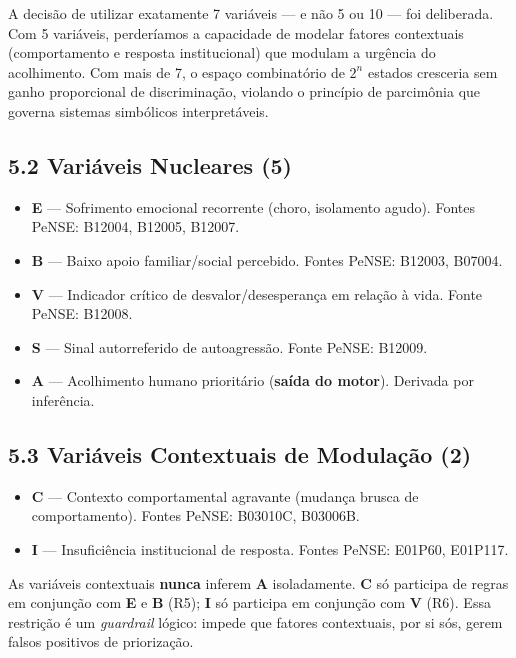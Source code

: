 \documentclass[11pt]{article}
\providecommand{\tightlist}{%
      \setlength{\itemsep}{0pt}\setlength{\parskip}{0pt}}
\begin{document}
A decisão de utilizar exatamente 7 variáveis --- e não 5 ou 10 --- foi
deliberada. Com 5 variáveis, perderíamos a capacidade de modelar fatores
contextuais (comportamento e resposta institucional) que modulam a
urgência do acolhimento. Com mais de 7, o espaço combinatório de \(2^n\)
estados cresceria sem ganho proporcional de discriminação, violando o
princípio de parcimônia que governa sistemas simbólicos interpretáveis.

\subsection{5.2 Variáveis Nucleares (5)}\label{variuxe1veis-nucleares-5}

\begin{itemize}
\tightlist
\item
  \textbf{E} --- Sofrimento emocional recorrente (choro, isolamento
  agudo). Fontes PeNSE: B12004, B12005, B12007.
\item
  \textbf{B} --- Baixo apoio familiar/social percebido. Fontes PeNSE:
  B12003, B07004.
\item
  \textbf{V} --- Indicador crítico de desvalor/desesperança em relação à
  vida. Fonte PeNSE: B12008.
\item
  \textbf{S} --- Sinal autorreferido de autoagressão. Fonte PeNSE:
  B12009.
\item
  \textbf{A} --- Acolhimento humano prioritário (\textbf{saída do
  motor}). Derivada por inferência.
\end{itemize}

\subsection{5.3 Variáveis Contextuais de Modulação
(2)}\label{variuxe1veis-contextuais-de-modulauxe7uxe3o-2}

\begin{itemize}
\tightlist
\item
  \textbf{C} --- Contexto comportamental agravante (mudança brusca de
  comportamento). Fontes PeNSE: B03010C, B03006B.
\item
  \textbf{I} --- Insuficiência institucional de resposta. Fontes PeNSE:
  E01P60, E01P117.
\end{itemize}

As variáveis contextuais \textbf{nunca} inferem \textbf{A} isoladamente.
\textbf{C} só participa de regras em conjunção com \textbf{E} e
\textbf{B} (R5); \textbf{I} só participa em conjunção com \textbf{V}
(R6). Essa restrição é um \emph{guardrail} lógico: impede que fatores
contextuais, por si sós, gerem falsos positivos de priorização.
\end{document}
